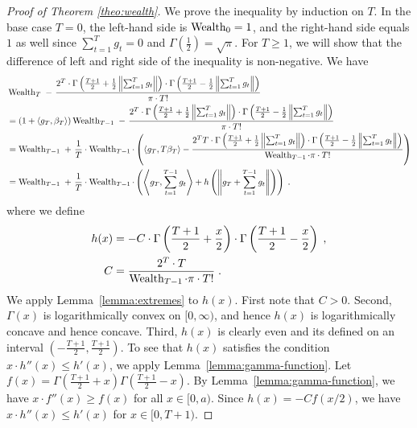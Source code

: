 \begin{proof}[Proof of Theorem \ref{theo:wealth}]
We prove the inequality by induction on $T$. In the base case $T=0$, the
left-hand side is $\operatorname{Wealth}_0 = 1$, and the right-hand side equals $1$ as well
since $\sum_{t=1}^T g_t = 0$ and $\Gamma(\frac{1}{2}) = \sqrt{\pi}$. For $T \ge
1$, we will show that the difference of left and right side of the inequality is
non-negative. We have
\begin{align*}
& \operatorname{Wealth}_T \ - \ \frac{2^T \cdot \Gamma \left(\frac{T+1}{2} + \frac{1}{2}\left\|\sum_{t=1}^T g_t \right\| \right) \cdot \Gamma \left(\frac{T+1}{2} - \frac{1}{2} \left\|\sum_{t=1}^T g_t \right\| \right)}{\pi \cdot T!} \\
& = (1 + \langle g_T, \beta_T \rangle) \operatorname{Wealth}_{T-1} \ - \ \frac{2^T \cdot \Gamma \left(\frac{T+1}{2} + \frac{1}{2}\left\|\sum_{t=1}^T g_t \right\| \right) \cdot \Gamma \left(\frac{T+1}{2} - \frac{1}{2} \left\|\sum_{t=1}^T g_t \right\| \right)}{\pi \cdot T!} \\
& = \operatorname{Wealth}_{T-1} \ + \ \frac{1}{T} \cdot \operatorname{Wealth}_{T-1} \cdot \left(\langle g_T, T \beta_T \rangle - \frac{2^T T \cdot \Gamma \left(\frac{T+1}{2} + \frac{1}{2}\left\|\sum_{t=1}^T g_t \right\| \right) \cdot \Gamma \left(\frac{T+1}{2} - \frac{1}{2} \left\|\sum_{t=1}^T g_t \right\| \right)}{\operatorname{Wealth}_{T-1} \cdot \pi \cdot T!} \right) \\
& = \operatorname{Wealth}_{T-1} \ + \ \frac{1}{T} \cdot \operatorname{Wealth}_{T-1} \cdot \left( \left\langle g_T, \sum_{t=1}^{T-1} g_t \right\rangle + h\left( \left\|g_T + \sum_{t=1}^{T-1} g_t \right\| \right) \right) \; .
\end{align*}
where we define
\begin{align*}
h(x) & = - C \cdot \Gamma \left(\frac{T+1}{2} + \frac{x}{2} \right) \cdot \Gamma \left(\frac{T+1}{2} - \frac{x}{2} \right) \; ,  \\
C & = \frac{2^T \cdot T}{\operatorname{Wealth}_{T-1} \cdot \pi \cdot T!} \; .
\end{align*}
We apply Lemma~\ref{lemma:extremes} to $h(x)$. First note that $C > 0$. Second,
$\Gamma(x)$ is logarithmically convex on $[0,\infty)$, and hence $h(x)$ is
logarithmically concave and hence concave. Third, $h(x)$ is clearly even and its
defined on an interval $(-\frac{T+1}{2}, \frac{T+1}{2})$. To see that $h(x)$
satisfies the condition $x \cdot h''(x) \le h'(x)$, we apply
Lemma~\ref{lemma:gamma-function}. Let $f(x) = \Gamma(\frac{T+1}{2}+x)
\Gamma(\frac{T+1}{2}-x)$. By Lemma~\ref{lemma:gamma-function}, we have $x \cdot
f''(x) \ge f(x)$ for all $x \in [0,a)$. Since $h(x) = - C f(x/2)$, we have $x
\cdot h''(x) \le h'(x)$ for $x \in [0,T+1)$.


\end{proof}
